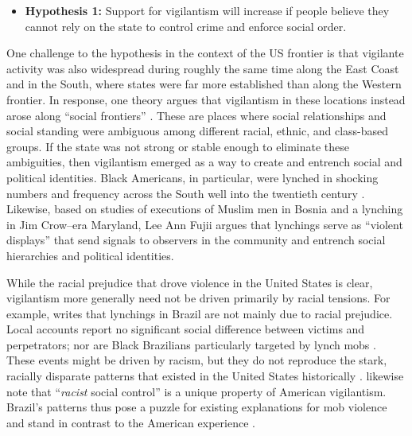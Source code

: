 \documentclass[12pt,ansiapaper]{article}
\begin{document}
\begin{itemize}
  \item \textbf{Hypothesis 1:} Support for vigilantism will increase if people believe they cannot rely on the state to control crime and enforce social order.
\end{itemize}

One challenge to the hypothesis in the context of the US frontier is that vigilante activity was also widespread during roughly the same time along the East Coast and in the South, where states were far more established than along the Western frontier. In response, one theory argues that vigilantism in these locations instead arose along ``social frontiers'' \citep{obert2018keeping}. These are places where social relationships and social standing were ambiguous among different racial, ethnic, and class-based groups. If the state was not strong or stable enough to eliminate these ambiguities, then vigilantism emerged as a way to create and entrench social and political identities. Black Americans, in particular, were lynched in shocking numbers and frequency across the South well into the twentieth century \citep{dray2003hands,seguin2019national}. Likewise, based on studies of executions of Muslim men in Bosnia and a lynching in Jim Crow--era Maryland, Lee Ann Fujii \citeyearpar{fujii2017talk} argues that lynchings serve as ``violent displays'' that send signals to observers in the community and entrench social hierarchies and political identities.

While the racial prejudice that drove violence in the United States is clear, vigilantism more generally need not be driven primarily by racial tensions. For example, \citet{martins2015linchamentos} writes that lynchings in Brazil are not mainly due to racial prejudice. Local accounts report no significant social difference between victims and perpetrators; nor are Black Brazilians particularly targeted by lynch mobs \citep{band2015rocinha, pearson2018latam, sinhoretto2009linchamentos}. These events might be driven by racism, but they do not reproduce the stark, racially disparate patterns that existed in the United States historically \citep[23]{martins2015linchamentos}. \citet[8]{jung2020lynching} likewise note that ``\textit{racist} social control'' is a unique property of American vigilantism. Brazil's patterns thus pose a puzzle for existing explanations for mob violence and stand in contrast to the American experience \citep{smaangs2016doing, wood2011lynching}. 
\end{document}
